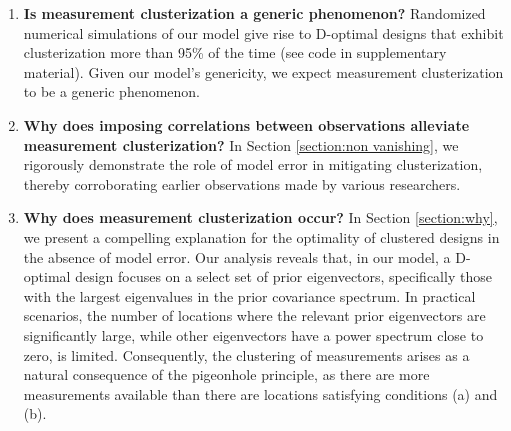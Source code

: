 \begin{enumerate}

\item \label{q:generic} \textbf{Is measurement clusterization a
  generic phenomenon?}
  Randomized numerical simulations of our model give rise to D-optimal
  designs that exhibit clusterization more than 95\% of the time (see
  code in supplementary material). Given our model's genericity, we
  expect measurement clusterization to be a generic phenomenon.

\item \label{q:mitigate} \textbf{Why does imposing correlations
  between observations alleviate measurement clusterization?} In
  Section \ref{section:non vanishing}, we rigorously demonstrate the
  role of model error in mitigating clusterization, thereby
  corroborating earlier observations made by various researchers.

\item \label{q:why} \textbf{Why does measurement clusterization
  occur?} In Section \ref{section:why}, we present a compelling
  explanation for the optimality of clustered designs in the absence
  of model error. Our analysis reveals that, in our model, a D-optimal
  design focuses on a select set of prior eigenvectors, specifically
  those with the largest eigenvalues in the prior covariance
  spectrum. In practical scenarios, the number of locations where the
  relevant prior eigenvectors are significantly large, while other
  eigenvectors have a power spectrum close to zero, is
  limited. Consequently, the clustering of measurements arises as a
  natural consequence of the pigeonhole principle, as there are more
  measurements available than there are locations satisfying
  conditions (a) and (b).




\end{enumerate}
